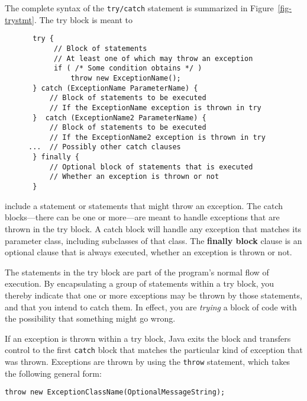\noindent The complete syntax of the {\tt try/catch} statement is
summarized in Figure~\ref{fig-trystmt}.  The try block is meant to
\begin{figure}[h!]
\jjjprogstart
\begin{jjjlisting}
\begin{lstlisting}
 try {
      // Block of statements
      // At least one of which may throw an exception
      if ( /* Some condition obtains */ )
          throw new ExceptionName();
 } catch (ExceptionName ParameterName) {
     // Block of statements to be executed
     // If the ExceptionName exception is thrown in try
 }  catch (ExceptionName2 ParameterName) {
     // Block of statements to be executed
     // If the ExceptionName2 exception is thrown in try
...  // Possibly other catch clauses
 } finally {
     // Optional block of statements that is executed
     // Whether an exception is thrown or not
 }
\end{lstlisting}
\end{jjjlisting}
\end{figure}
include a statement or statements that might throw an exception.  The
catch blocks---there can be one or more---are meant to handle
exceptions that are thrown in the try block.  A catch block will
handle any exception that matches its parameter class, including
subclasses of that class.  The {\bf finally block} clause is an
optional clause that is always executed, whether an exception is
thrown or not.



The statements in the try block are part of the program's normal flow
of execution.  By encapsulating a group of statements within a
try block, you thereby indicate that one or more exceptions may be
thrown by those statements, and that you intend to catch them.   In
effect, you are {\it trying} a block of code with the possibility that
something might go wrong.

If an exception is thrown within a try block, Java exits the block and
transfers control to the first {\tt catch} block that matches the
particular kind of exception that was thrown.   Exceptions are thrown
by using the {\tt throw} statement, which takes the following general
form:

\begin{jjjlisting}
\begin{lstlisting}
throw new ExceptionClassName(OptionalMessageString);
\end{lstlisting}
\end{jjjlisting}

